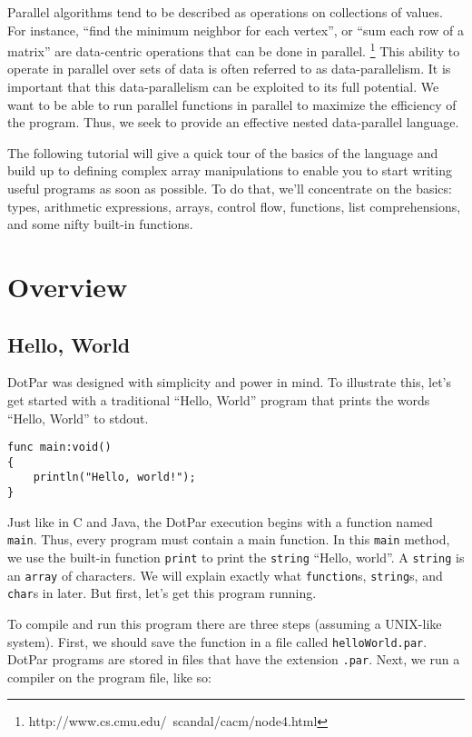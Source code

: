 Parallel algorithms tend to be described as operations on collections of values.
For instance, ``find the minimum neighbor for each vertex'', or ``sum each row
of a matrix'' are data-centric operations that can be done in parallel.
\footnote{http://www.cs.cmu.edu/~scandal/cacm/node4.html} This ability to
operate in parallel over sets of data is often referred to as data-parallelism.
It is important that this data-parallelism can be exploited to its full
potential. We want to be able to run parallel functions in parallel to maximize
the efficiency of the program. Thus, we seek to provide an effective nested
data-parallel language.

The following tutorial will give a quick tour of the basics of the language and
build up to defining complex array manipulations to enable you to start writing
useful programs as soon as possible. To do that, we'll concentrate on the
basics: types, arithmetic expressions, arrays, control flow, functions, list
comprehensions, and some nifty built-in functions.

\section{Overview}
\subsection{Hello, World}
DotPar was designed with simplicity and power in mind. To illustrate this, let's
get started with a traditional ``Hello, World'' program that prints the words
``Hello, World'' to stdout.

\begin{verbatim}
func main:void()
{
    println("Hello, world!");
}
\end{verbatim}

Just like in C and Java, the DotPar execution begins with a function named
\verb=main=. Thus, every program must contain a main function. In this
\verb=main= method, we use the built-in function \verb=print= to print the
\verb=string= ``Hello, world''. A \verb=string= is an \verb=array= of
characters. We will explain exactly what \verb=function=s, \verb=string=s, and
\verb=char=s in later. But first, let's get this program running.

To compile and run this program there are three steps (assuming a UNIX-like
system). First, we should save the function in a file called
\verb=helloWorld.par=. DotPar programs are stored in files that have the
extension \verb=.par=. Next, we run a compiler on the program file, like so:

